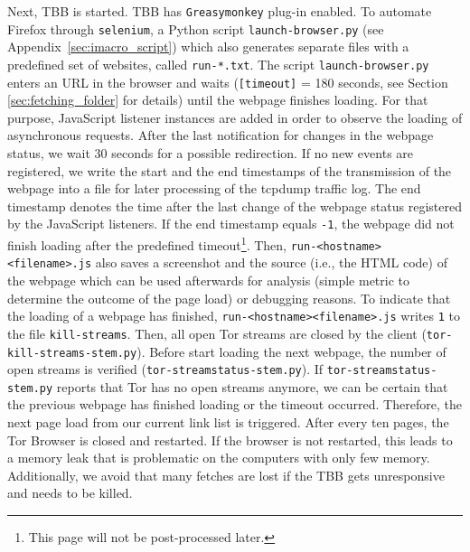 Next, \ac{TBB} is started. \ac{TBB} has \texttt{Greasymonkey} plug-in enabled. To automate Firefox through \texttt{selenium}, a Python script \texttt{launch-browser.py} (see Appendix~\ref{sec:imacro_script}) which also generates separate files with a predefined set of websites, called \texttt{run-*.txt}. The script \texttt{launch-browser.py} enters an \ac{URL} in the browser and waits (\texttt{[timeout]} = 180 seconds, see Section \ref{sec:fetching_folder} for details) until the webpage finishes loading. For that purpose, JavaScript listener instances are added in order to observe the loading of asynchronous requests. After the last notification for changes in the webpage status, we wait 30 seconds for a possible redirection. If no new events are registered, we write the start and the end timestamps of the transmission of the webpage into a file for later processing of the tcpdump traffic log. The end timestamp denotes the time after the last change of the webpage status registered by the JavaScript listeners. If the end timestamp equals \texttt{-1}, the webpage did not finish loading after the predefined timeout\footnote{This page will not be post-processed later.}. Then, \texttt{run-<hostname><filename>.js} also saves a screenshot and the source (i.e., the \ac{HTML} code) of the webpage which can be used afterwards for analysis (simple metric to determine the outcome of the page load) or debugging reasons. To indicate that the loading of a webpage has finished, \texttt{run-<hostname><filename>.js} writes \texttt{1} to the file \texttt{kill-streams}. Then, all open Tor streams are closed by the client (\texttt{tor-kill-streams-stem.py}). Before start loading the next webpage, the number of open streams is verified (\texttt{tor-streamstatus-stem.py}). If \texttt{tor-streamstatus-stem.py} reports that Tor has no open streams anymore, we can be certain that the previous webpage has finished loading or the timeout occurred. Therefore, the next page load from our current link list is triggered. After every ten pages, the Tor Browser is closed and restarted. If the browser is not restarted, this leads to a memory leak that is problematic on the computers with only few memory. Additionally, we avoid that many fetches are lost if the \ac{TBB} gets unresponsive and needs to be killed. 



